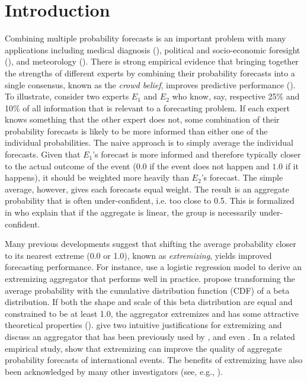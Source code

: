 \documentclass[11pt,twoside]{article}
\theoremstyle{definition}
\theoremstyle{definition}
\begin{document}
\section{Introduction}
Combining multiple probability forecasts is an important problem with many applications including medical diagnosis (\cite{wilson1998prediction, pepe2003statistical}), political and socio-economic foresight (\cite{tetlock2005expert}), and meteorology (\cite{sanders1963subjective, vislocky1995improved, baars2005performance}). There is strong empirical evidence that bringing together the strengths of different experts by combining their probability forecasts into a single consensus, known as the \textit{crowd belief},  improves predictive performance (\cite{clemen1989combining, armstrong2001combining}). To illustrate, consider two experts $E_1$ and $E_2$ who know, say, respective 25\% and 10\% of all information that is relevant to a forecasting problem. If each expert knows something that the other expert does not, some combination of their probability forecasts is likely to be more informed than either one of the individual probabilities. The naive approach is to simply average the individual forecasts.  Given that $E_1$'s forecast is more informed and therefore typically closer to the actual outcome of the event ($0.0$ if the event does not happen and $1.0$ if it happens), it should be weighted more heavily than $E_2$'s forecast. The simple average, however, gives each forecasts equal weight. The result is an aggregate probability that is often under-confident, i.e. too close to 0.5. This is formalized in \cite{Ranjan08} who explain that if the aggregate is linear, the group is necessarily under-confident.


Many previous developments suggest that shifting the average probability closer to its nearest extreme (0.0 or 1.0), known as \textit{extremizing}, yields improved forecasting performance. For instance, \cite{satopaa} use a logistic regression model to derive an extremizing aggregator that performs well in practice. \cite{Ranjan08} propose transforming the average probability with the cumulative distribution function (CDF) of a beta distribution. If both the shape and scale of this beta distribution are equal and constrained to be at least 1.0,  the aggregator extremizes and has some attractive theoretical properties (\cite{Wallsten2001}).  \cite{Baron} give two intuitive justifications for extremizing and discuss an aggregator that has been previously used by \cite{Erev1994, shlomi2010subjective}, and even \cite{karmarkar1978subjectively}. In a related empirical study, \cite{mellers} show that extremizing can improve the quality of aggregate probability forecasts of international events. The benefits of extremizing have also been acknowledged by many other investigators (see, e.g., \cite{turner2013forecast, Ariely00theeffects}).
\end{document}
